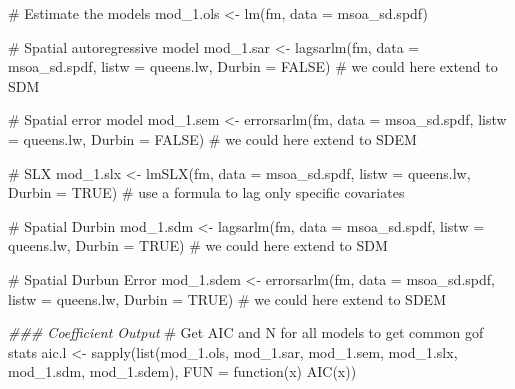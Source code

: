 \documentclass[
  letterpaper,
]{scrbook}
\newenvironment{Shaded}{\begin{snugshade}}{\end{snugshade}}
\newcommand{\AttributeTok}[1]{\textcolor[rgb]{0.40,0.45,0.13}{#1}}
\newcommand{\CommentTok}[1]{\textcolor[rgb]{0.37,0.37,0.37}{#1}}
\newcommand{\ConstantTok}[1]{\textcolor[rgb]{0.56,0.35,0.01}{#1}}
\newcommand{\ControlFlowTok}[1]{\textcolor[rgb]{0.00,0.23,0.31}{#1}}
\newcommand{\DocumentationTok}[1]{\textcolor[rgb]{0.37,0.37,0.37}{\textit{#1}}}
\newcommand{\FunctionTok}[1]{\textcolor[rgb]{0.28,0.35,0.67}{#1}}
\newcommand{\NormalTok}[1]{\textcolor[rgb]{0.00,0.23,0.31}{#1}}
\newcommand{\OtherTok}[1]{\textcolor[rgb]{0.00,0.23,0.31}{#1}}
\begin{document}
\begin{Shaded}
\begin{Highlighting}[]
\CommentTok{\# Estimate the models}
\NormalTok{mod\_1.ols }\OtherTok{\textless{}{-}} \FunctionTok{lm}\NormalTok{(fm, }\AttributeTok{data =}\NormalTok{ msoa\_sd.spdf)}

\CommentTok{\# Spatial autoregressive model}
\NormalTok{mod\_1.sar }\OtherTok{\textless{}{-}} \FunctionTok{lagsarlm}\NormalTok{(fm,  }
                      \AttributeTok{data =}\NormalTok{ msoa\_sd.spdf, }
                      \AttributeTok{listw =}\NormalTok{ queens.lw,}
                      \AttributeTok{Durbin =} \ConstantTok{FALSE}\NormalTok{) }\CommentTok{\# we could here extend to SDM}

\CommentTok{\# Spatial error model}
\NormalTok{mod\_1.sem }\OtherTok{\textless{}{-}} \FunctionTok{errorsarlm}\NormalTok{(fm,  }
                        \AttributeTok{data =}\NormalTok{ msoa\_sd.spdf, }
                        \AttributeTok{listw =}\NormalTok{ queens.lw,}
                        \AttributeTok{Durbin =} \ConstantTok{FALSE}\NormalTok{) }\CommentTok{\# we could here extend to SDEM}

\CommentTok{\# SLX}
\NormalTok{mod\_1.slx }\OtherTok{\textless{}{-}} \FunctionTok{lmSLX}\NormalTok{(fm,  }
                   \AttributeTok{data =}\NormalTok{ msoa\_sd.spdf, }
                   \AttributeTok{listw =}\NormalTok{ queens.lw, }
                   \AttributeTok{Durbin =} \ConstantTok{TRUE}\NormalTok{) }\CommentTok{\# use a formula to lag only specific covariates}

\CommentTok{\# Spatial Durbin}
\NormalTok{mod\_1.sdm }\OtherTok{\textless{}{-}} \FunctionTok{lagsarlm}\NormalTok{(fm,  }
                      \AttributeTok{data =}\NormalTok{ msoa\_sd.spdf, }
                      \AttributeTok{listw =}\NormalTok{ queens.lw,}
                      \AttributeTok{Durbin =} \ConstantTok{TRUE}\NormalTok{) }\CommentTok{\# we could here extend to SDM}

\CommentTok{\# Spatial Durbun Error}
\NormalTok{mod\_1.sdem }\OtherTok{\textless{}{-}} \FunctionTok{errorsarlm}\NormalTok{(fm,  }
                        \AttributeTok{data =}\NormalTok{ msoa\_sd.spdf, }
                        \AttributeTok{listw =}\NormalTok{ queens.lw,}
                        \AttributeTok{Durbin =} \ConstantTok{TRUE}\NormalTok{) }\CommentTok{\# we could here extend to SDEM}


\DocumentationTok{\#\#\# Coefficient Output}
\CommentTok{\# Get AIC and N for all models to get common gof stats}
\NormalTok{aic.l }\OtherTok{\textless{}{-}} \FunctionTok{sapply}\NormalTok{(}\FunctionTok{list}\NormalTok{(mod\_1.ols, mod\_1.sar, mod\_1.sem, mod\_1.slx, mod\_1.sdm, mod\_1.sdem),}
       \AttributeTok{FUN =} \ControlFlowTok{function}\NormalTok{(x) }\FunctionTok{AIC}\NormalTok{(x))}


\end{Highlighting}
\end{Shaded}
\end{document}
